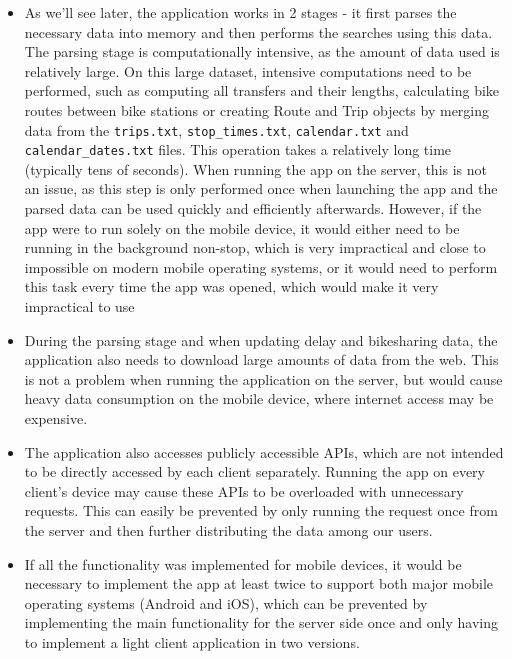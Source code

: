 \begin{itemize}
    \item As we'll see later, the application works in 2 stages - it first parses the necessary data into memory and then performs the searches using this data. The parsing stage is computationally intensive, as the amount of data used is relatively large. On this large dataset, intensive computations need to be performed, such as computing all transfers and their lengths, calculating bike routes between bike stations or creating Route and Trip objects by merging data from the \texttt{trips.txt}, \texttt{stop\_times.txt}, \texttt{calendar.txt} and \texttt{calendar\_dates.txt} files. This operation takes a relatively long time (typically tens of seconds). When running the app on the server, this is not an issue, as this step is only performed once when launching the app and the parsed data can be used quickly and efficiently afterwards. However, if the app were to run solely on the mobile device, it would either need to be running in the background non-stop, which is very impractical and close to impossible on modern mobile operating systems, or it would need to perform this task every time the app was opened, which would make it very impractical to use

    \item During the parsing stage and when updating delay and bikesharing data, the application also needs to download large amounts of data from the web. This is not a problem when running the application on the server, but would cause heavy data consumption on the mobile device, where internet access may be expensive.

    \item The application also accesses publicly accessible APIs, which are not intended to be directly accessed by each client separately. Running the app on every client's device may cause these APIs to be overloaded with unnecessary requests. This can easily be prevented by only running the request once from the server and then further distributing the data among our users.

    \item If all the functionality was implemented for mobile devices, it would be necessary to implement the app at least twice to support both major mobile operating systems (Android and iOS), which can be prevented by implementing the main functionality for the server side once and only having to implement a light client application in two versions.
\end{itemize}


